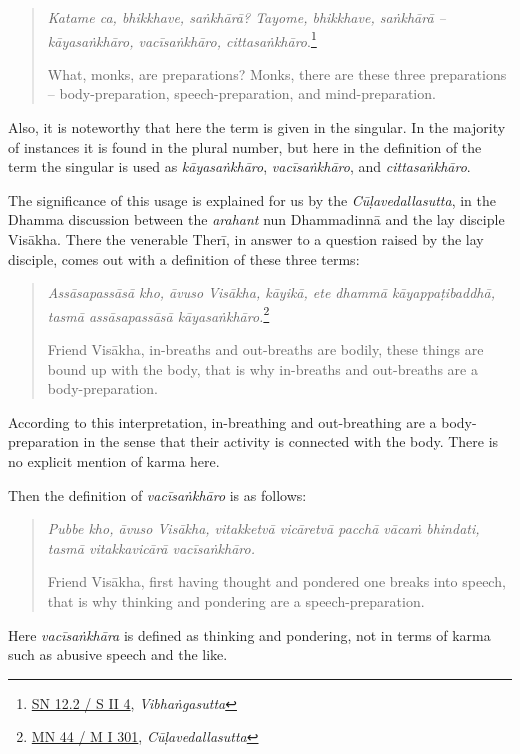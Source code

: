 \begin{quote}
\emph{Katame ca, bhikkhave, saṅkhārā? Tayome, bhikkhave, saṅkhārā -- kāyasaṅkhāro, vacīsaṅkhāro, cittasaṅkhāro}.\footnote{\href{https://suttacentral.net/sn12.2/pli/ms}{SN 12.2 / S II 4}, \emph{Vibhaṅgasutta}}

What, monks, are preparations? Monks, there are these three preparations -- body-preparation, speech-preparation, and mind-preparation.
\end{quote}

Also, it is noteworthy that here the term is given in the singular. In the majority of instances it is found in the plural number, but here in the definition of the term the singular is used as \emph{kāyasaṅkhāro}, \emph{vacīsaṅkhāro}, and \emph{cittasaṅkhāro}.

The significance of this usage is explained for us by the \emph{Cūḷavedallasutta}, in the Dhamma discussion between the \emph{arahant} nun Dhammadinnā and the lay disciple Visākha. There the venerable Therī, in answer to a question raised by the lay disciple, comes out with a definition of these three terms:

\begin{quote}
\emph{Assāsapassāsā kho, āvuso Visākha, kāyikā, ete dhammā kāyappaṭibaddhā, tasmā assāsapassāsā kāyasaṅkhāro.}\footnote{\href{https://suttacentral.net/mn44/pli/ms}{MN 44 / M I 301}, \emph{Cūḷavedallasutta}}

Friend Visākha, in-breaths and out-breaths are bodily, these things are bound up with the body, that is why in-breaths and out-breaths are a body-preparation.
\end{quote}

According to this interpretation, in-breathing and out-breathing are a body-preparation in the sense that their activity is connected with the body. There is no explicit mention of karma here.

Then the definition of \emph{vacīsaṅkhāro} is as follows:

\begin{quote}
\emph{Pubbe kho, āvuso Visākha, vitakketvā vicāretvā pacchā vācaṁ bhindati, tasmā vitakkavicārā vacīsaṅkhāro.}

Friend Visākha, first having thought and pondered one breaks into speech, that is why thinking and pondering are a speech-preparation.
\end{quote}

Here \emph{vacīsaṅkhāra} is defined as thinking and pondering, not in terms of karma such as abusive speech and the like.

